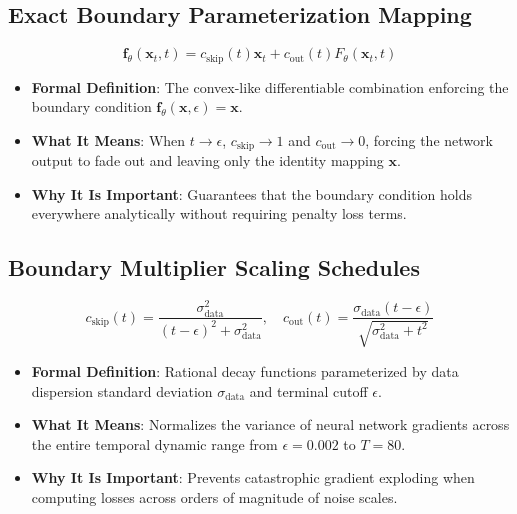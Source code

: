 \documentclass[11pt,a4paper]{article}
\theoremstyle{definition}
\begin{document}
\subsection{Exact Boundary Parameterization Mapping}
{\boldmath
\begin{equation}
\mathbf{f}_\theta(\mathbf{x}_t, t) = c_{\text{skip}}(t)\mathbf{x}_t + c_{\text{out}}(t) F_\theta(\mathbf{x}_t, t)
\end{equation}
}
\begin{itemize}
    \item \textbf{Formal Definition}: The convex-like differentiable combination enforcing the boundary condition $\mathbf{f}_\theta(\mathbf{x}, \epsilon) = \mathbf{x}$.
    \item \textbf{What It Means}: When $t \to \epsilon$, $c_{\text{skip}} \to 1$ and $c_{\text{out}} \to 0$, forcing the network output to fade out and leaving only the identity mapping $\mathbf{x}$.
    \item \textbf{Why It Is Important}: Guarantees that the boundary condition holds everywhere analytically without requiring penalty loss terms.
\end{itemize}

\subsection{Boundary Multiplier Scaling Schedules}
{\boldmath
\begin{equation}
c_{\text{skip}}(t) = \frac{\sigma_{\text{data}}^2}{(t - \epsilon)^2 + \sigma_{\text{data}}^2}, \quad c_{\text{out}}(t) = \frac{\sigma_{\text{data}}(t - \epsilon)}{\sqrt{\sigma_{\text{data}}^2 + t^2}}
\end{equation}
}
\begin{itemize}
    \item \textbf{Formal Definition}: Rational decay functions parameterized by data dispersion standard deviation $\sigma_{\text{data}}$ and terminal cutoff $\epsilon$.
    \item \textbf{What It Means}: Normalizes the variance of neural network gradients across the entire temporal dynamic range from $\epsilon = 0.002$ to $T = 80$.
    \item \textbf{Why It Is Important}: Prevents catastrophic gradient exploding when computing losses across orders of magnitude of noise scales.
\end{itemize}
\end{document}
